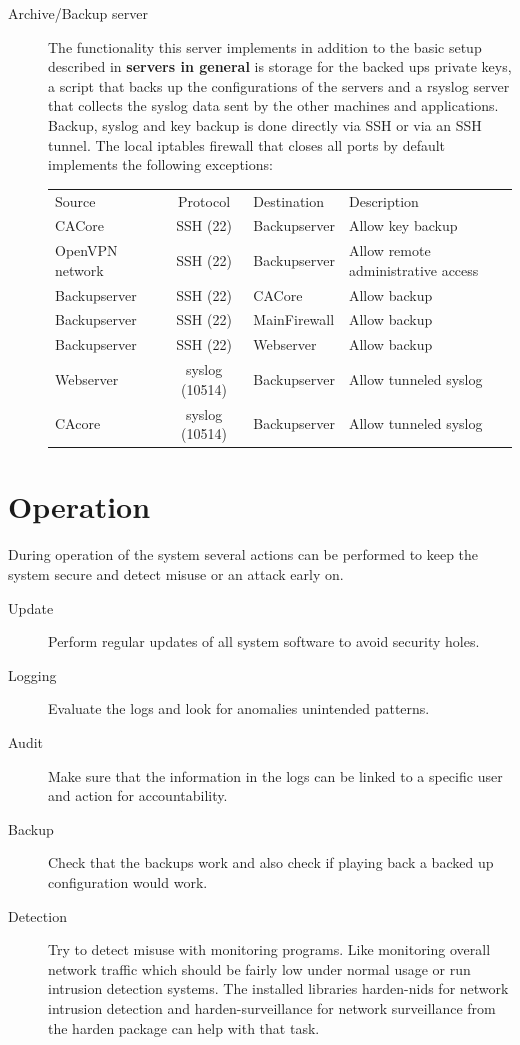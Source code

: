 \documentclass[a4paper, toc=index, 12pt, DIV14, twoside, BCOR2cm, headsepline, numbers=noenddot, bibliography=totoc]{scrbook}
\begin{document}
\begin{description}
\item[Archive/Backup server ] The functionality this server implements in addition to the basic setup described in {\bfseries servers in general} is storage for the backed ups private keys, a script that backs up the configurations of the servers and a rsyslog server that collects the syslog data sent by the other machines and applications. Backup, syslog and key backup is done directly via SSH or via an SSH tunnel.\newline
The local iptables firewall that closes all ports by default implements the following exceptions:\newline
\begin{tabular}{p{2.5cm} c l p{4.5cm}}
Source & Protocol & Destination & Description\\
\cline{1-4}
CACore & SSH (22) & Backupserver & Allow key backup\\
\cline{1-4}
OpenVPN network & SSH (22) &  Backupserver & Allow remote administrative access\\
\cline{1-4}
Backupserver & SSH (22) & CACore & Allow backup\\
\cline{1-4}
Backupserver & SSH (22) & MainFirewall & Allow backup\\
\cline{1-4}
Backupserver & SSH (22) & Webserver & Allow backup\\
\cline{1-4}
Webserver & syslog (10514) & Backupserver & Allow tunneled syslog\\
\cline{1-4}
CAcore & syslog (10514) & Backupserver & Allow tunneled syslog\\
\end{tabular}
\end{description}


\section{Operation}
During operation of the system several actions can be performed to keep the system secure and detect misuse or an attack early on. \newline
\begin{description}
\item[Update ] Perform regular updates of all system software to avoid security holes.
\item[Logging ] Evaluate the logs and look for anomalies unintended patterns.
\item[Audit ] Make sure that the information in the logs can be linked to a specific user and action for accountability.
\item[Backup ] Check that the backups work and also check if playing back a backed up configuration would work.
\item[Detection ] Try to detect misuse with monitoring programs. Like monitoring overall network traffic which should be fairly low under normal usage or run intrusion detection systems. The installed libraries harden-nids for network intrusion detection and harden-surveillance for network surveillance from the harden package can help with that task.
\end{description}
\end{document}

